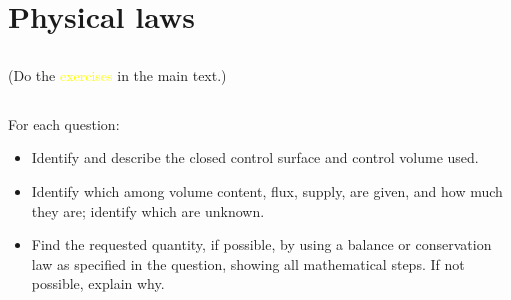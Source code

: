 \documentclass[a4paper,12pt,%
onecolumn,oneside,%
british%
]{memoir}
\renewcommand*{\|}[1][]{\nonscript\:#1\vert\nonscript\:\mathopen{}}
\begin{document}




\printpagenotes*
\clearpage
\chapter{Physical laws}
\label{cha:laws}
\setcounter{section}{-1}

\section{}
(Do the \textcolor{yellow}{exercises} in the main text.)



\section{}
\label{sec:calc_from_bal}

For each question:
\begin{itemize}[nosep,label=]
\item Identify and describe the closed control surface and control volume used.
\item Identify which among volume content, flux, supply, are given, and how much they are; identify which are unknown.
\item Find the requested quantity, if possible, by using a balance or conservation law as specified in the question, showing all mathematical steps. If not possible, explain why.
\end{itemize}
\end{document}
